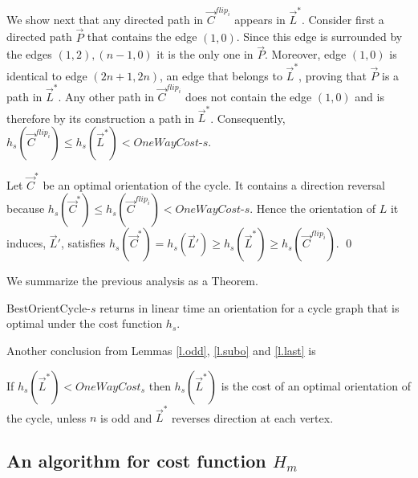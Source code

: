 	We show next that any directed path in $\vec{C}^{flip_i}$ appears in $\vec{L}^*$. Consider first a directed path $\vec{P}$ that contains the edge $(1,0)$. 
	Since this edge is surrounded by the edges $(1,2), (n-1,0)$ it is the only one in $\vec{P}$. Moreover, edge $(1,0)$ is identical to edge $(2n+1,2n)$, an edge that belongs to 
	$\vec{L}^*$, proving that  $\vec{P}$ is a path in $\vec{L}^*$.
	Any other path in $\vec{C}^{flip_i}$ does not contain the edge $(1,0)$ and is therefore by its construction a path in $\vec{L}^*$. 
	Consequently, $h_s(\vec{C}^{flip_i})\leq h_s(\vec{L}^*)<\textit{OneWayCost-s}$.
	
	Let $\vec{C}^*$ be an optimal orientation of the cycle. It contains a direction reversal
	because $h_s(\vec{C}^*)\leq h_s(\vec{C}^{flip_i})<\textit{OneWayCost-s}$.
	Hence the orientation of $L$ it induces, $\vec{L}'$, satisfies
	$h_s(\vec{C}^*)=h_s(\vec{L}')\geq h_s(\vec{L}^*)\geq h_s(\vec{C}^{flip_i})$.
\qed

We summarize the previous analysis as a Theorem.
\begin{theorem}
	BestOrientCycle-$s$  returns  in linear time an orientation for a cycle graph that is optimal under the cost function $h_s$.
\end{theorem}

Another conclusion from Lemmas \ref{l.odd}, \ref{l.subo} and \ref{l.last} is
\begin{corollary}
	If $h_s(\vec{L}^*) < {OneWayCost_s}$ then $h_s(\vec{L}^*)$ is the cost of an optimal orientation of the cycle, unless $n$ is odd and $\vec{L}^*$ reverses direction at each vertex.
\end{corollary}

\subsection{An algorithm for cost function $H_m$}\label{s.c}


